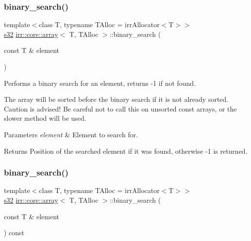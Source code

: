 \subsubsection{\texorpdfstring{binary\+\_\+search()}{binary\_search()}\hspace{0.1cm}{\footnotesize\ttfamily [2/6]}}
{\footnotesize\ttfamily template$<$class T, typename T\+Alloc = irr\+Allocator$<$\+T$>$$>$ \\
\hyperlink{namespaceirr_ac66849b7a6ed16e30ebede579f9b47c6}{s32} \hyperlink{classirr_1_1core_1_1array}{irr\+::core\+::array}$<$ T, T\+Alloc $>$\+::binary\+\_\+search (\begin{DoxyParamCaption}\item[{const T \&}]{element }\end{DoxyParamCaption})\hspace{0.3cm}{\ttfamily [inline]}}



Performs a binary search for an element, returns -\/1 if not found. 

The array will be sorted before the binary search if it is not already sorted. Caution is advised! Be careful not to call this on unsorted const arrays, or the slower method will be used. 
\begin{DoxyParams}{Parameters}
{\em element} & Element to search for. \\
\hline
\end{DoxyParams}
\begin{DoxyReturn}{Returns}
Position of the searched element if it was found, otherwise -\/1 is returned. 
\end{DoxyReturn}
\mbox{\label{classirr_1_1core_1_1array_aec40f807c683671067d52e83d7b72a82}} 
\subsubsection{\texorpdfstring{binary\+\_\+search()}{binary\_search()}\hspace{0.1cm}{\footnotesize\ttfamily [3/6]}}
{\footnotesize\ttfamily template$<$class T, typename T\+Alloc = irr\+Allocator$<$\+T$>$$>$ \\
\hyperlink{namespaceirr_ac66849b7a6ed16e30ebede579f9b47c6}{s32} \hyperlink{classirr_1_1core_1_1array}{irr\+::core\+::array}$<$ T, T\+Alloc $>$\+::binary\+\_\+search (\begin{DoxyParamCaption}\item[{const T \&}]{element }\end{DoxyParamCaption}) const\hspace{0.3cm}{\ttfamily [inline]}}



